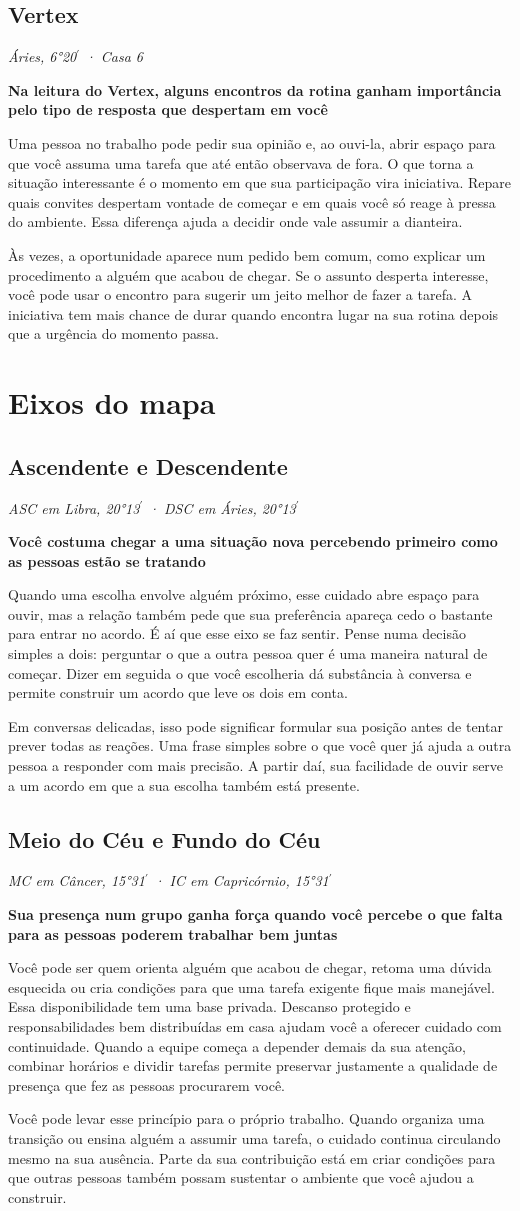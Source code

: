 \documentclass[11pt,a4paper]{article}
\newcommand{\leitura}[3]{\subsection{#1}\textit{#2}\par #3}
\newcommand{\subtituloleitura}[1]{\textbf{#1}\par\nopagebreak[4]}
\begin{document}
\leitura{Vertex}{Áries, 6°20\ensuremath{^{\prime}} · Casa 6}{
\subtituloleitura{Na leitura do Vertex, alguns encontros da rotina ganham importância pelo tipo de resposta que despertam em você} Uma pessoa no trabalho pode pedir sua opinião e, ao ouvi-la, abrir espaço para que você assuma uma tarefa que até então observava de fora. O que torna a situação interessante é o momento em que sua participação vira iniciativa. Repare quais convites despertam vontade de começar e em quais você só reage à pressa do ambiente. Essa diferença ajuda a decidir onde vale assumir a dianteira.

Às vezes, a oportunidade aparece num pedido bem comum, como explicar um procedimento a alguém que acabou de chegar. Se o assunto desperta interesse, você pode usar o encontro para sugerir um jeito melhor de fazer a tarefa. A iniciativa tem mais chance de durar quando encontra lugar na sua rotina depois que a urgência do momento passa.
}

\section{Eixos do mapa}

\leitura{Ascendente e Descendente}{ASC em Libra, 20°13\ensuremath{^{\prime}} · DSC em Áries, 20°13\ensuremath{^{\prime}}}{
\subtituloleitura{Você costuma chegar a uma situação nova percebendo primeiro como as pessoas estão se tratando} Quando uma escolha envolve alguém próximo, esse cuidado abre espaço para ouvir, mas a relação também pede que sua preferência apareça cedo o bastante para entrar no acordo. É aí que esse eixo se faz sentir. Pense numa decisão simples a dois: perguntar o que a outra pessoa quer é uma maneira natural de começar. Dizer em seguida o que você escolheria dá substância à conversa e permite construir um acordo que leve os dois em conta.

Em conversas delicadas, isso pode significar formular sua posição antes de tentar prever todas as reações. Uma frase simples sobre o que você quer já ajuda a outra pessoa a responder com mais precisão. A partir daí, sua facilidade de ouvir serve a um acordo em que a sua escolha também está presente.
}

\leitura{Meio do Céu e Fundo do Céu}{MC em Câncer, 15°31\ensuremath{^{\prime}} · IC em Capricórnio, 15°31\ensuremath{^{\prime}}}{
\subtituloleitura{Sua presença num grupo ganha força quando você percebe o que falta para as pessoas poderem trabalhar bem juntas} Você pode ser quem orienta alguém que acabou de chegar, retoma uma dúvida esquecida ou cria condições para que uma tarefa exigente fique mais manejável. Essa disponibilidade tem uma base privada. Descanso protegido e responsabilidades bem distribuídas em casa ajudam você a oferecer cuidado com continuidade. Quando a equipe começa a depender demais da sua atenção, combinar horários e dividir tarefas permite preservar justamente a qualidade de presença que fez as pessoas procurarem você.

Você pode levar esse princípio para o próprio trabalho. Quando organiza uma transição ou ensina alguém a assumir uma tarefa, o cuidado continua circulando mesmo na sua ausência. Parte da sua contribuição está em criar condições para que outras pessoas também possam sustentar o ambiente que você ajudou a construir.
}
\end{document}
